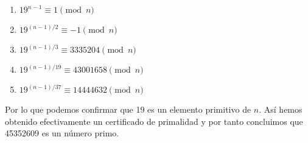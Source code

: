 \documentclass[fleqn]{article}
\begin{document}
    \begin{enumerate}
        \item $ 19^{n-1} \equiv 1 \pmod{n}$
        \item $ 19^{(n-1)/2} \equiv -1 \pmod{n}$
        \item $ 19^{(n-1)/3} \equiv 3335204 \pmod{n}$
        \item $ 19^{(n-1)/19} \equiv 43001658 \pmod{n}$
        \item $ 19^{(n-1)/37} \equiv 14444632 \pmod{n}$
    \end{enumerate}

    Por lo que podemos confirmar que 19 es un elemento primitivo de $n$. Así hemos obtenido efectivamente un certificado de primalidad y por tanto concluimos
    que 45352609 es un número primo.
\end{document}
